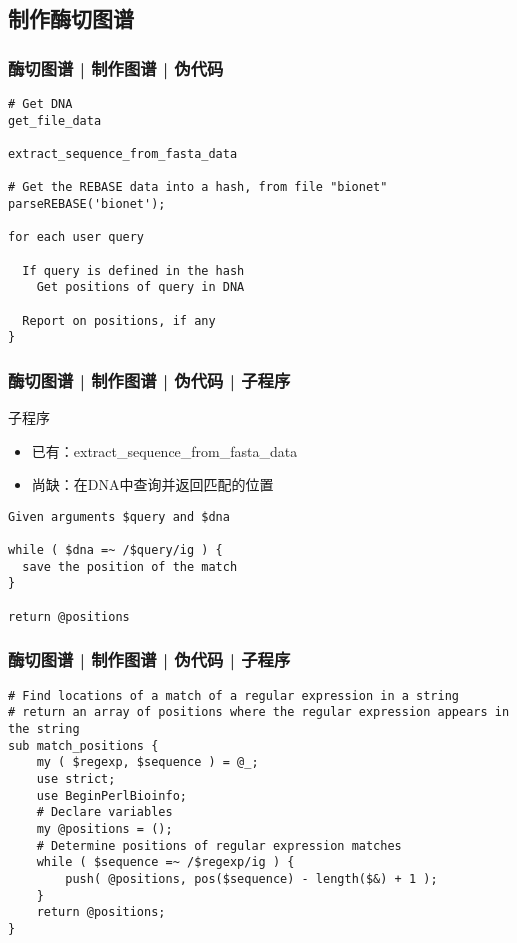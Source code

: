 \subsection{制作酶切图谱}
\begin{frame}[fragile]
  \frametitle{酶切图谱 | 制作图谱 | 伪代码}
  \vspace{-0.6em}
\begin{lstlisting}
# Get DNA
get_file_data

extract_sequence_from_fasta_data

# Get the REBASE data into a hash, from file "bionet"
parseREBASE('bionet');

for each user query

  If query is defined in the hash
    Get positions of query in DNA

  Report on positions, if any
}
\end{lstlisting}
\end{frame}

\begin{frame}[fragile]
  \frametitle{酶切图谱 | 制作图谱 | 伪代码 | 子程序}
  \begin{block}{子程序}
    \begin{itemize}
      \item 已有：extract\_sequence\_from\_fasta\_data
      \item 尚缺：在DNA中查询并返回匹配的位置
    \end{itemize}
  \end{block}
  \pause
\begin{lstlisting}
Given arguments $query and $dna

while ( $dna =~ /$query/ig ) {
  save the position of the match
}

return @positions
\end{lstlisting}
\end{frame}

\begin{frame}[fragile]
  \frametitle{酶切图谱 | 制作图谱 | 伪代码 | \alert{子程序}}
  \vspace{-0.6em}
\begin{lstlisting}[basicstyle=\small\tt,numberstyle=\footnotesize]
# Find locations of a match of a regular expression in a string
# return an array of positions where the regular expression appears in the string
sub match_positions {
    my ( $regexp, $sequence ) = @_;
    use strict;
    use BeginPerlBioinfo;
    # Declare variables
    my @positions = ();
    # Determine positions of regular expression matches
    while ( $sequence =~ /$regexp/ig ) {
        push( @positions, pos($sequence) - length($&) + 1 );
    }
    return @positions;
}
\end{lstlisting}
\end{frame}

